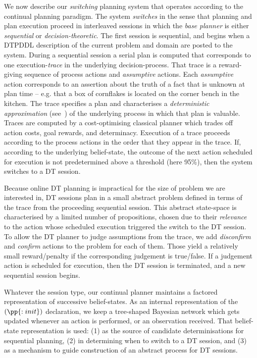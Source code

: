 
\newcommand{\entropy}{\ensuremath{\mathrm{H}}}


We now describe our {\em switching} planning system that operates
according to the continual planning paradigm. The system {\em
switches} in the sense that planning and plan execution proceed in
interleaved sessions in which the {\em base planner} is either {\em
sequential} or {\em decision-theoretic}.  The first session is
sequential, and begins when a DTPDDL description of the current
problem and domain are posted to the system.  During a sequential
session a serial plan is computed that corresponds to one
execution-{\em trace} in the underlying decision-process. That trace
is a reward-giving sequence of process actions and {\em assumptive}
actions. Each {\em assumptive} action corresponds to an assertion
about the truth of a fact that is unknown at plan time -- e.g. that a
box of cornflakes is located on the corner bench in the kitchen. The
trace specifies a plan and characterises a {\em deterministic
approximation} (see~\cite{yoon:etal:2008}) of the underlying process
in which that plan is valuable. Traces are computed by a
cost-optimising classical planner which trades off action costs, goal
rewards, and determinacy. Execution of a trace proceeds according to
the process actions in the order that they appear in the trace. If,
according to the underlying belief-state, the outcome of the next
action scheduled for execution is not predetermined above a threshold
(here 95\%), then the system switches to a DT session.


Because online DT planning is impractical for the size of problem we
are interested in, DT sessions plan in a small abstract problem
defined in terms of the trace from the proceeding sequential
session. This abstract state-space is characterised by a limited
number of propositions, chosen due to their {\em relevance} to the
action whose scheduled execution triggered the switch to the DT
session.  To allow the DT planner to judge assumptions from the trace,
we add {\em disconfirm} and {\em confirm} actions to the problem for
each of them. Those yield a relatively small reward/penalty if the
corresponding judgement is true/false. If a judgement action is
scheduled for execution, then the DT session is terminated, and a new
sequential session begins.

Whatever the session type, our continual planner maintains a factored
representation of successive belief-states.  As an internal
representation of the $(\pp{:init})$ declaration, we keep a
tree-shaped Bayesian network which gets updated whenever an action is
performed, or an observation received. That belief-state
representation is used: (1) as the source of candidate
determinisations for sequential planning, (2) in determining when to
switch to a DT session, and (3) as a mechanism to guide construction
of an abstract process for DT sessions.


